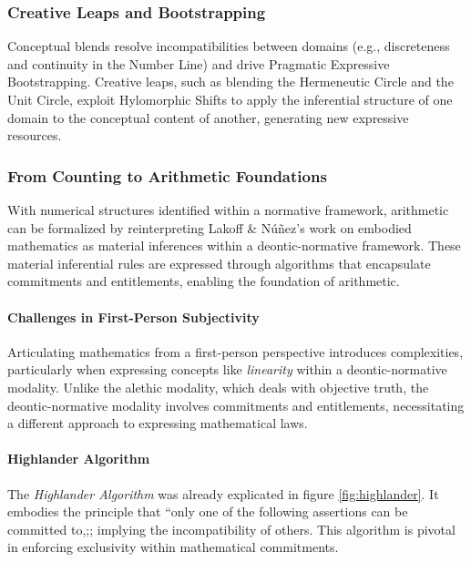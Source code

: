 \documentclass[12pt]{book}
\begin{document}
\subsubsection{Creative Leaps and Bootstrapping}

Conceptual blends resolve incompatibilities between domains (e.g., discreteness and continuity in the Number Line) and drive Pragmatic Expressive Bootstrapping. Creative leaps, such as blending the Hermeneutic Circle and the Unit Circle, exploit Hylomorphic Shifts to apply the inferential structure of one domain to the conceptual content of another, generating new expressive resources.

\subsubsection{From Counting to Arithmetic Foundations}\label{from-counting-to-arithmetic-foundations}

With numerical structures identified within a normative framework, arithmetic can be formalized by reinterpreting Lakoff \& Núñez's \parencite*{Lakoff2000} work on embodied mathematics as material inferences within a deontic-normative framework. These material inferential rules are expressed through algorithms that encapsulate commitments and entitlements, enabling the foundation of arithmetic.

\paragraph{Challenges in First-Person Subjectivity}

Articulating mathematics from a first-person perspective introduces complexities, particularly when expressing concepts like \textit{linearity} within a deontic-normative modality. Unlike the alethic modality, which deals with objective truth, the deontic-normative modality involves commitments and entitlements, necessitating a different approach to expressing mathematical laws.

\paragraph{Highlander Algorithm}\label{highlander-algorithm}

The \textit{Highlander Algorithm} was already explicated in figure \ref{fig:highlander}. It embodies the principle that ``only one of the following assertions can be committed to,;; implying the incompatibility of others. This algorithm is pivotal in enforcing exclusivity within mathematical commitments.
\end{document}
